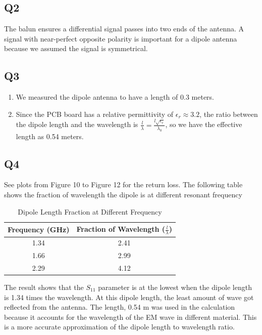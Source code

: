 \documentclass{article} %
\begin{document}
\subsection*{Q2}
The balun ensures a differential signal passes into two ends of the antenna. A signal with near-perfect opposite polarity is important for a dipole antenna because we assumed the signal is symmetrical.

\subsection*{Q3}
\begin{enumerate}
    \item We measured the dipole antenna to have a length of 0.3 meters.
    \item Since the PCB board has a relative permittivity of $\epsilon_r \approx 3.2$, the ratio between the dipole length and the wavelength is $\frac{l}{\lambda} = \frac{l \sqrt{\epsilon_r}}{\lambda_0}$, so we have the effective length as 0.54 meters.
\end{enumerate}

\subsection*{Q4}
See plots from Figure 10 to Figure 12 for the return loss. The following table shows the fraction of wavelength the dipole is at different resonant frequency
\begin{table}[h]
    \centering
    \begin{tabular}{|c|c|}
        \hline
        Frequency (GHz) & Fraction of Wavelength ($\frac{l}{\lambda}$) \\
        \hline
        1.34            & 2.41                                         \\
        1.66            & 2.99                                         \\
        2.29            & 4.12                                         \\
        \hline
    \end{tabular}
    \caption{Dipole Length Fraction at Different Frequency}
    \label{tab:yourlabel}
\end{table}

The result shows that the $S_{11}$ parameter is at the lowest when the dipole length is 1.34 times the wavelength. At this dipole length, the least amount of wave got reflected from the antenna.
The length, 0.54 m was used in the calculation because it accounts for the wavelength of the EM wave in different material. This is a more accurate approximation of the dipole length to wavelength ratio.
\end{document}
